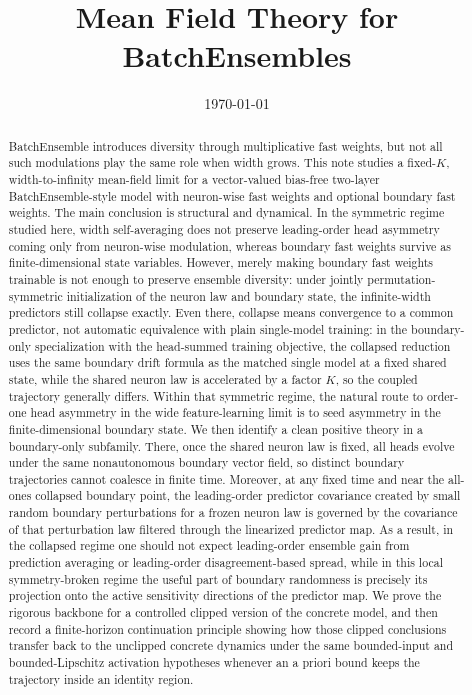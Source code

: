 \documentclass[11pt]{article}
\title{Mean Field Theory for BatchEnsembles}
\author{}
\date{\today}
\theoremstyle{definition}
\begin{document}
\maketitle

\begin{abstract}
BatchEnsemble introduces diversity through multiplicative fast weights, but not all such modulations play the same role when width grows. This note studies a fixed-$K$, width-to-infinity mean-field limit for a vector-valued bias-free two-layer BatchEnsemble-style model with neuron-wise fast weights and optional boundary fast weights. The main conclusion is structural and dynamical. In the symmetric regime studied here, width self-averaging does not preserve leading-order head asymmetry coming only from neuron-wise modulation, whereas boundary fast weights survive as finite-dimensional state variables. However, merely making boundary fast weights trainable is not enough to preserve ensemble diversity: under jointly permutation-symmetric initialization of the neuron law and boundary state, the infinite-width predictors still collapse exactly. Even there, collapse means convergence to a common predictor, not automatic equivalence with plain single-model training: in the boundary-only specialization with the head-summed training objective, the collapsed reduction uses the same boundary drift formula as the matched single model at a fixed shared state, while the shared neuron law is accelerated by a factor $K$, so the coupled trajectory generally differs. Within that symmetric regime, the natural route to order-one head asymmetry in the wide feature-learning limit is to seed asymmetry in the finite-dimensional boundary state. We then identify a clean positive theory in a boundary-only subfamily. There, once the shared neuron law is fixed, all heads evolve under the same nonautonomous boundary vector field, so distinct boundary trajectories cannot coalesce in finite time. Moreover, at any fixed time and near the all-ones collapsed boundary point, the leading-order predictor covariance created by small random boundary perturbations for a frozen neuron law is governed by the covariance of that perturbation law filtered through the linearized predictor map. As a result, in the collapsed regime one should not expect leading-order ensemble gain from prediction averaging or leading-order disagreement-based spread, while in this local symmetry-broken regime the useful part of boundary randomness is precisely its projection onto the active sensitivity directions of the predictor map. We prove the rigorous backbone for a controlled clipped version of the concrete model, and then record a finite-horizon continuation principle showing how those clipped conclusions transfer back to the unclipped concrete dynamics under the same bounded-input and bounded-Lipschitz activation hypotheses whenever an a priori bound keeps the trajectory inside an identity region.
\end{abstract}
\end{document}
